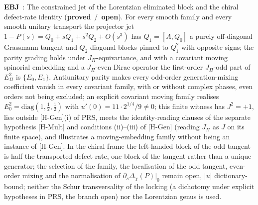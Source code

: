 \documentclass[11pt,a4paper]{article}
\newcommand{\sproved}{\textcolor{cproved}{\textbf{proved}}}
\newcommand{\sopen}{\textcolor{copen}{\textbf{open}}}
\begin{document}
    \textbf{EBJ}~\cite{Beau2026ebj}: The constrained jet of the Lorentzian eliminated block and the chiral
    defect-rate identity (\sproved\ /\ \sopen). For every smooth family and every smooth unitary transport the
    projector jet
    $1-P(s) = Q_0 + sQ_1 + s^2Q_2 + O(s^3)$ has $Q_1 = [A, Q_0]$ a purely off-diagonal Grassmann tangent and
    $Q_2$ diagonal blocks pinned to $Q_1^2$ with opposite signs; the parity grading holds under
    $J_\Pi$-equivariance, and with a covariant moving spinorial embedding and a $J_\Pi$-even Dirac operator the
    first-order $J_\Pi$-odd part of $E_\Pi^2$ is $\{E_0, E_1\}$. Antiunitary parity makes every odd-order
    generation-mixing coefficient vanish in every covariant family, with or without complex phases, even orders
    not being excluded; an explicit covariant moving family realises $E_0^2 = \mathrm{diag}(1, \tfrac12,
    \tfrac12)$ with $u'(0) = 11 \cdot 2^{1/4}/9 \neq 0$; this finite witness has $J^2 = +1$, lies outside
    [H-Gen](i) of PRS, meets the identity-reading clauses of the separate hypothesis [H-Mult] and conditions
    (ii)--(iii) of [H-Gen] (reading $J_\Pi$ as $J$ on its finite space), and illustrates a moving-embedding family
    without being an instance of [H-Gen]. In the chiral frame the left-handed block of the odd
    tangent is half the transported defect rate, one block of the tangent rather than a unique generator; the
    selection of the family, the localisation of the odd tangent, even-order mixing and the normalisation of
    $\partial_s\Delta_\chi(P)|_0$ remain open, $|u|$ dictionary-bound; neither the Schur transversality of the locking
    (a dichotomy under explicit hypotheses in PRS, the branch open) nor the Lorentzian genus is used.
\end{document}
